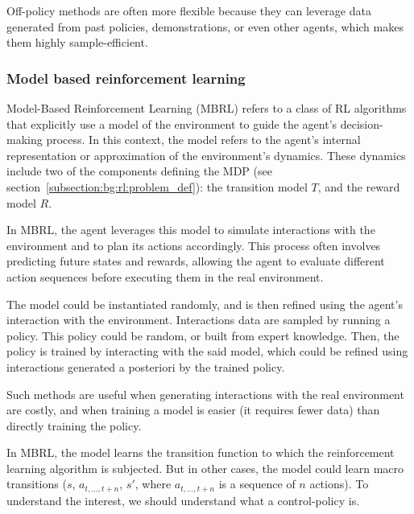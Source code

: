 Off-policy methods are often more flexible because they can leverage data generated from past policies, demonstrations,
or even other agents, which makes them highly sample-efficient.

\subsubsection{Model based reinforcement learning}

Model-Based Reinforcement Learning (MBRL) refers to a class of RL algorithms that explicitly
use a model of the environment to guide the agent's decision-making process.
In this context, the model refers to the agent's internal representation or approximation of the environment's dynamics.
These dynamics include two of the components defining the MDP (see section~\ref{subsection:bg:rl:problem_def}): the transition model $T$,
and the reward model $R$.

In MBRL, the agent leverages this model to simulate interactions with the environment and to plan its actions accordingly.
This process often involves predicting future states and rewards, allowing the agent to evaluate different action
sequences before executing them in the real environment.

The model could be instantiated randomly, and is then refined using the agent's interaction with the environment.
Interactions data are sampled by running a policy.
This policy could be random, or built from expert knowledge.
Then, the policy is trained by interacting with the said model, which could be refined using interactions generated a
posteriori by the trained policy.

Such methods are useful when generating interactions with the real environment are costly, and when training a model
is easier (it requires fewer data) than directly training the policy.

In MBRL, the model learns the transition function to which the reinforcement learning algorithm is subjected.
But in other cases, the model could learn macro transitions ($s$, $a_{t, \dots, t+n}$, $s'$, where $a_{t, \dots, t+n}$
is a sequence of $n$ actions). %
To understand the interest, %
we should understand what a control-policy is.


